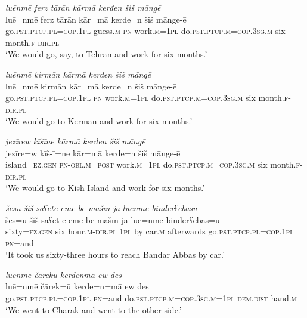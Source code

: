 \ea \label{ŽM.23}
\textit{luēnmē ferz tārān kārmā kerđen šiš māngē} \\ 
\gll luē=nmē ferz tārān kār=mā kerđe=n šiš mānge-ē \\ 
 go\textsc{.pst}\textsc{.ptcp}\textsc{.pl}\textsc{=cop}\textsc{.\textsc{1pl}} guess\textsc{.m} \textsc{pn} work\textsc{.m}\textsc{=\textsc{1pl}} do\textsc{.pst}\textsc{.ptcp}\textsc{.m}\textsc{=cop}\textsc{.3sg}\textsc{.m} six month\textsc{.f}\textsc{-dir}\textsc{.pl} \\ 
\glt `We would go, say, to Tehran and work for six months.'
\z 
 
\ea \label{ŽM.24}
\textit{luēnmē kirmān kārmā kerđen šiš māngē} \\ 
\gll luē=nmē kirmān kār=mā kerđe=n šiš mānge-ē \\ 
 go\textsc{.pst}\textsc{.ptcp}\textsc{.pl}\textsc{=cop}\textsc{.\textsc{1pl}} \textsc{pn} work\textsc{.m}\textsc{=\textsc{1pl}} do\textsc{.pst}\textsc{.ptcp}\textsc{.m}\textsc{=cop}\textsc{.3sg}\textsc{.m} six month\textsc{.f}\textsc{-dir}\textsc{.pl} \\ 
\glt `We would go to Kerman and work for six months.'
\z 
 
\ea \label{ŽM.25}
\textit{jezīrew kīšīne kārmā kerđen šiš māngē} \\ 
\gll jezīre=w kīš-ī=ne kār=mā kerđe=n šiš mānge-ē \\ 
 island\textsc{=ez.gen} \textsc{pn}\textsc{-obl}\textsc{.m}\textsc{=\textsc{post}} work\textsc{.m}\textsc{=\textsc{1pl}} do\textsc{.pst}\textsc{.ptcp}\textsc{.m}\textsc{=cop}\textsc{.3sg}\textsc{.m} six month\textsc{.f}\textsc{-dir}\textsc{.pl} \\ 
\glt `We would go to Kish Island and work for six months.'
\z 
 
\ea \label{ŽM.33}
\textit{šesū šiš sāʕetē ēme be māšīn jā luēnmē binderʕebāsū} \\ 
\gll šes=ū šiš sāʕet-ē ēme be māšīn jā luē=nmē binderʕebās=ū \\ 
 sixty\textsc{=ez.gen} six hour\textsc{.m}\textsc{-dir}\textsc{.pl} \textsc{1pl} by car\textsc{.m} afterwards go\textsc{.pst}\textsc{.ptcp}\textsc{.pl}\textsc{=cop}\textsc{.\textsc{1pl}} \textsc{pn}=and \\ 
\glt `It took us sixty-three hours to reach Bandar Abbas by car.'
\z 
 
\ea \label{ŽM.34}
\textit{luēnmē čārekū kerdenmā ew des} \\ 
\gll luē=nmē čārek=ū kerde=n=mā ew des \\ 
 go\textsc{.pst}\textsc{.ptcp}\textsc{.pl}\textsc{=cop}\textsc{.\textsc{1pl}} \textsc{pn}=and do\textsc{.pst}\textsc{.ptcp}\textsc{.m}\textsc{=cop}\textsc{.3sg}\textsc{.m}\textsc{=\textsc{1pl}} \textsc{dem.dist} hand\textsc{.m} \\ 
\glt `We went to Charak and went to the other side.'
\z 
 
